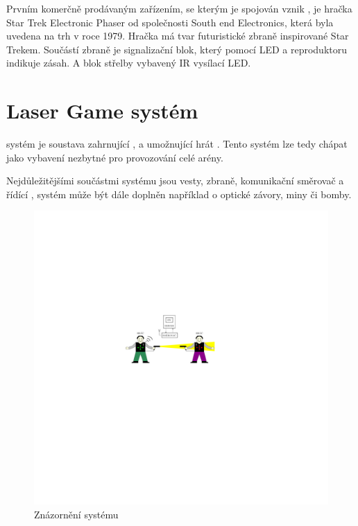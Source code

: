 Prvním komerčně prodávaným zařízením, se kterým je spojován vznik , je hračka Star Trek Electronic Phaser od společnosti South end Electronics, která byla uvedena na trh v roce 1979. Hračka má tvar futuristické zbraně inspirované Star Trekem. Součástí zbraně je signalizační blok, který pomocí LED a reproduktoru indikuje zásah. A blok střelby vybavený IR vysílací LED.

\section{Laser Game systém}
 systém je soustava zahrnující ,  a  umožnující hrát . Tento systém lze tedy chápat jako vybavení nezbytné pro provozování celé arény.

Nejdůležitějšími součástmi  systému jsou vesty, zbraně, komunikační směrovač a řídící ,  systém může být dále doplněn například o optické závory, miny či bomby.

\begin{figure}[H]
    \begin{center}
        \includegraphics[width=\textwidth]{img/lgs}
    \end{center}
    \caption{Znázornění  systému}
\end{figure}

